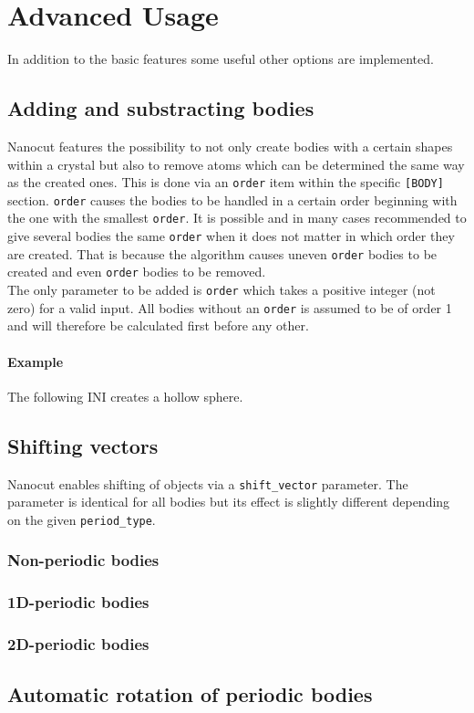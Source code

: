 \section{Advanced Usage}
In addition to the basic features some useful other options are implemented. 
\subsection{Adding and substracting bodies}
Nanocut features the possibility to not only create bodies with a certain shapes within a crystal but also to remove atoms which can be determined the same way as the created ones. This is done via an \lstinline{order} item within the specific \lstinline{[BODY]} section. \lstinline{order} causes the bodies to be handled in a certain order beginning with the one with the smallest \lstinline{order}. It is possible and in many cases recommended to give several bodies the same \lstinline{order} when it does not matter in which order they are created. That is because the algorithm causes uneven \lstinline{order} bodies to be created and even \lstinline{order} bodies to be removed.\\
The only parameter to be added is \lstinline{order} which takes a positive integer (not zero) for a valid input. All bodies without an \lstinline{order} is assumed to be of order 1 and will therefore be calculated first before any other.
\paragraph{Example}
The following INI creates a hollow sphere.

\subsection{Shifting vectors}
Nanocut enables shifting of objects via a \lstinline{shift_vector} parameter. The parameter is identical for all bodies but its effect is slightly different depending on the given \lstinline{period_type}.
\subsubsection{Non-periodic bodies}

\subsubsection{1D-periodic bodies}
\subsubsection{2D-periodic bodies}
\subsection{Automatic rotation of periodic bodies}
